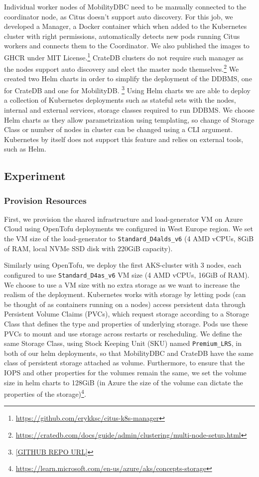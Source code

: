 Individual worker nodes of MobilityDBC need to be manually connected to the coordinator node, as Citus doesn't support auto discovery.
For this job, we developed a Manager, a Docker container which when added to the Kubernetes cluster with right permissions, automatically detects new pods running Citus workers and connects them to the Coordinator.
We also published the images to GHCR under MIT License.\footnote{\url{https://github.com/erykksc/citus-k8s-manager}}
CrateDB clusters do not require such manager as the nodes support auto discovery and elect the master node themselves.\footnote{\url{https://cratedb.com/docs/guide/admin/clustering/multi-node-setup.html}}
We created two Helm charts in order to simplify the deployment of the DDBMS, one for CrateDB and one for MobilityDB. \footnote{\url{[GITHUB REPO URL]}}
Using Helm charts we are able to deploy a collection of Kubernetes deployments such as stateful sets with the nodes, internal and external services, storage classes required to run DDBMS.
We choose Helm charts as they allow parametrization using templating, so change of Storage Class or number of nodes in cluster can be changed using a CLI argument.
Kubernetes by itself does not support this feature and relies on external tools, such as Helm.

\subsection{Experiment}
\label{sec:experiment-results}

\subsubsection{Provision Resources}
First, we provision the shared infrastructure and load-generator VM on Azure Cloud using OpenTofu deployments we configured in West Europe region.
We set the VM size of the load-generator to \verb|Standard_D4alds_v6| (4 AMD vCPUs, 8GiB of RAM, local NVMe SSD disk with 220GiB capacity).

Similarly using OpenTofu, we deploy the first AKS-cluster with 3 nodes, each configured to use \verb|Standard_D4as_v6| VM size (4 AMD vCPUs, 16GiB of RAM).
We choose to use a VM size with no extra storage as we want to increase the realism of the deployment.
Kubernetes works with storage by letting pods (can be thought of as containers running on a nodes) access persistent data through Persistent Volume Claims (PVCs), which request storage according to a Storage Class that defines the type and properties of underlying storage.
Pods use these PVCs to mount and use storage across restarts or rescheduling.
We define the same Storage Class, using Stock Keeping Unit (SKU) named \verb|Premium_LRS|, in both of our helm deployments, so that MobilityDBC and CrateDB have the same class of persistent storage attached as volume.
Furthermore, to ensure that the IOPS and other properties for the volumes remain the same, we set the volume size in helm charts to 128GiB (in Azure the size of the volume can dictate the properties of the storage)\footnote{\url{https://learn.microsoft.com/en-us/azure/aks/concepts-storage}}.

